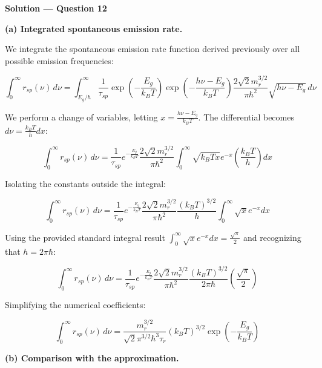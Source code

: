\textbf{\large Solution --- Question 12}

\textbf{(a) Integrated spontaneous emission rate.}

We integrate the spontaneous emission rate function derived previously over all possible emission frequencies:

\begin{equation*}
  \int_{0}^{\infty} r_{sp}(\nu)\,d\nu = \int_{E_g/h}^{\infty} \frac{1}{\tau_{sp}} \exp\left(-\frac{E_g}{k_B T}\right) \exp\left(-\frac{h\nu - E_g}{k_B T}\right) \frac{2\sqrt{2} m_r^{3/2}}{\pi \hbar^2} \sqrt{h\nu - E_g}\,d\nu
\end{equation*}

We perform a change of variables, letting $x = \frac{h\nu - E_g}{k_B T}$. The differential becomes $d\nu = \frac{k_B T}{h} dx$:

\begin{equation*}
  \int_{0}^{\infty} r_{sp}(\nu)\,d\nu = \frac{1}{\tau_{sp}} e^{-\frac{E_g}{k_B T}} \frac{2\sqrt{2} m_r^{3/2}}{\pi \hbar^2} \int_{0}^{\infty} \sqrt{k_B T x} e^{-x} \left(\frac{k_B T}{h}\right) dx
\end{equation*}

Isolating the constants outside the integral:

\begin{equation*}
  \int_{0}^{\infty} r_{sp}(\nu)\,d\nu = \frac{1}{\tau_{sp}} e^{-\frac{E_g}{k_B T}} \frac{2\sqrt{2} m_r^{3/2}}{\pi \hbar^2} \frac{(k_B T)^{3/2}}{h} \int_{0}^{\infty} \sqrt{x} e^{-x} dx
\end{equation*}

Using the provided standard integral result $\int_0^\infty \sqrt{x} e^{-x} dx = \frac{\sqrt{\pi}}{2}$ and recognizing that $h = 2\pi\hbar$:

\begin{equation*}
  \int_{0}^{\infty} r_{sp}(\nu)\,d\nu = \frac{1}{\tau_{sp}} e^{-\frac{E_g}{k_B T}} \frac{2\sqrt{2} m_r^{3/2}}{\pi \hbar^2} \frac{(k_B T)^{3/2}}{2\pi\hbar} \left(\frac{\sqrt{\pi}}{2}\right)
\end{equation*}

Simplifying the numerical coefficients:

\begin{equation*}
  \boxed{\int_{0}^{\infty} r_{sp}(\nu)\,d\nu = \frac{m_r^{3/2}}{\sqrt{2} \pi^{3/2} \hbar^3 \tau_r} (k_B T)^{3/2} \exp\left(-\frac{E_g}{k_B T}\right)}
\end{equation*}

\textbf{(b) Comparison with the approximation.}

